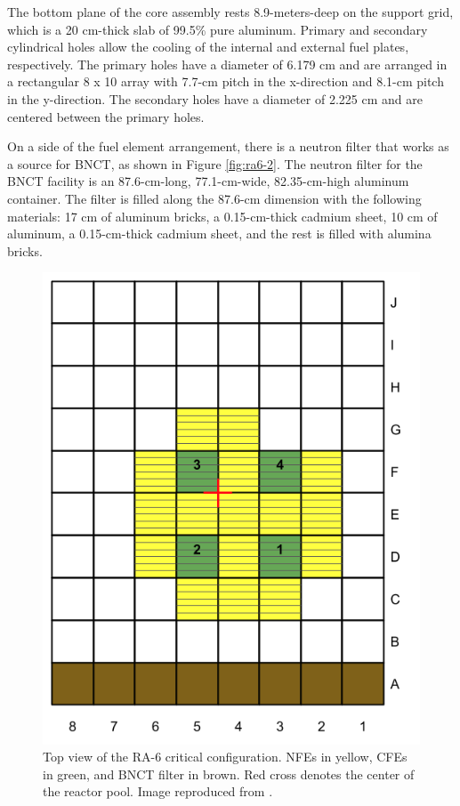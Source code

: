 \documentclass{style/nseJournal}
\begin{document}
The bottom plane of the core assembly rests 8.9-meters-deep on the support grid, which is a 20 cm-thick slab of 99.5\% pure aluminum.
Primary and secondary cylindrical holes allow the cooling of the internal and external fuel plates, respectively.
The primary holes have a diameter of 6.179 cm and are arranged in a rectangular 8 x 10 array with 7.7-cm pitch in the x-direction and 8.1-cm pitch in the y-direction.
The secondary holes have a diameter of 2.225 cm and are centered between the primary holes.

On a side of the fuel element arrangement, there is a neutron filter that works as a source for \gls*{BNCT}, as shown in Figure \ref{fig:ra6-2}.
The neutron filter for the \gls*{BNCT} facility is an 87.6-cm-long, 77.1-cm-wide, 82.35-cm-high aluminum container.
The filter is filled along the 87.6-cm dimension with the following materials: 17 cm of aluminum bricks, a 0.15-cm-thick cadmium sheet, 10 cm of aluminum, a 0.15-cm-thick cadmium sheet, and the rest is filled with alumina bricks.

\begin{figure}[htbp!] %
    \centering
    \includegraphics[width=0.55\linewidth]{figures/ra6_core2}
    \hfill
    \caption{Top view of the RA-6 critical configuration. NFEs in yellow, CFEs in green, and BNCT filter in brown. Red cross denotes the center of the reactor pool. Image reproduced from \cite{ICSBEP}.}
    \label{fig:ra6-1}
\end{figure}
\end{document}

